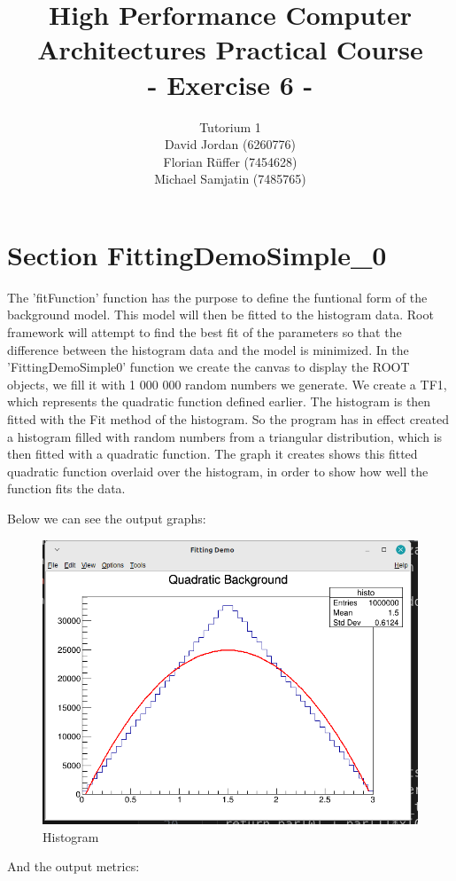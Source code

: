 \documentclass{article}
\title{\textbf{High Performance Computer Architectures Practical Course \\ - Exercise 6 -} \\[10mm]}
\author{Tutorium 1 \\[10mm] David Jordan (6260776) \\[1mm] Florian Rüffer (7454628) \\[1mm] Michael Samjatin (7485765) \\[10mm]}
\begin{document}
\maketitle
\newpage
\section*{Section FittingDemoSimple\_0}
The 'fitFunction' function has the purpose to define the funtional form of the background model. This model will then be fitted to the histogram data. Root framework will attempt to find the best fit of the parameters so that the difference between the histogram data and the model is minimized.
In the 'FittingDemoSimple0' function we create the canvas to display the ROOT objects, we fill it with 1 000 000 random numbers we generate. 
We create a TF1, which represents the quadratic function defined earlier. The histogram is then fitted with the Fit method of the histogram. 
So the program has in effect created a histogram filled with random numbers from a triangular distribution, which is then fitted with a quadratic function. The graph it creates shows this fitted quadratic function overlaid over the histogram, in order to show how well the function fits the data.

Below we can see the output graphs:
\begin{figure}[H]
    \centering
    \includegraphics[scale=0.3]{graph.png} 
    \caption{Histogram}
    \label{fig:graph}
  \end{figure}

And the output metrics:
\end{document}
